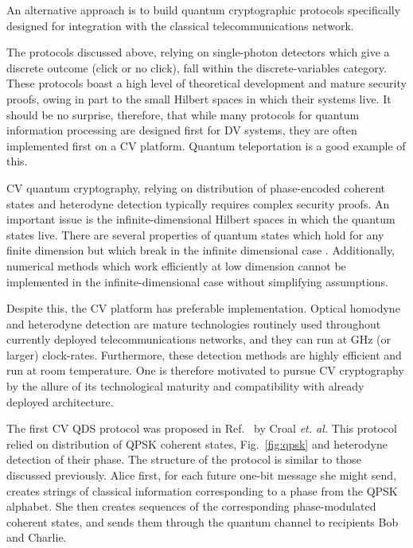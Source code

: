 An alternative approach is to build quantum cryptographic protocols specifically designed for integration with the classical telecommunications network. %

The protocols discussed above, relying on single-photon detectors which give a discrete outcome (click or no click), fall within the discrete-variables category. These protocols boast a high level of theoretical development and mature security proofs, owing in part to the small Hilbert spaces in which their systems live. It should be no surprise, therefore, that while many protocols for quantum information processing are designed first for DV systems, they are often implemented first on a CV platform. Quantum teleportation is a good example of this. 

CV quantum cryptography, relying on distribution of phase-encoded coherent states and heterodyne detection typically requires complex security proofs. An important issue is the infinite-dimensional Hilbert spaces in which the quantum states live. There are several properties of quantum states which hold for any finite dimension but which break in the infinite dimensional case \cite{Ranade2015}.  Additionally, numerical methods which work efficiently at low dimension \cite{Coles2016} cannot be implemented in the infinite-dimensional case without simplifying assumptions.

Despite this, the CV platform has preferable implementation. Optical homodyne and heterodyne detection are mature technologies routinely used throughout currently deployed telecommunications networks, and they can run at GHz (or larger) clock-rates. Furthermore, these detection methods are highly efficient and run at room temperature. One is therefore motivated to pursue CV cryptography by the allure of its technological maturity and compatibility with already deployed architecture. %

The first CV QDS protocol was proposed in Ref.~\cite{Croal2016} by Croal \emph{et. al.} This protocol relied on distribution of QPSK coherent states, Fig.~\ref{fig:qpsk} and heterodyne detection of their phase. The structure of the protocol is similar to those discussed previously. Alice first, for each future one-bit message she might send, creates strings of classical information corresponding to a phase from the QPSK alphabet. She then creates sequences of the corresponding phase-modulated coherent states, and sends them through the quantum channel to recipients Bob and Charlie.

